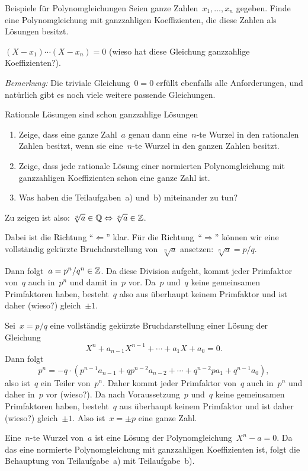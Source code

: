 \documentclass{algblatt}
\begin{document}
\ifloesungen\newpage\fi
\begin{aufgabe}{Beispiele für Polynomgleichungen}
Seien ganze Zahlen~$x_1, \ldots, x_n$ gegeben. Finde eine Polynomgleichung mit
ganzzahligen Koeffizienten, die diese Zahlen als Lösungen besitzt.
\begin{loesung}$(X-x_1) \cdots (X-x_n) = 0$ (wieso hat diese Gleichung
ganzzahlige Koeffizienten?).

\emph{Bemerkung:} Die triviale Gleichung~$0 = 0$ erfüllt ebenfalls alle
Anforderungen, und natürlich gibt es noch viele weitere passende Gleichungen.
\end{loesung}
\end{aufgabe}

\begin{aufgabe}{Rationale Lösungen sind schon ganzzahlige Lösungen}
\begin{enumerate}
  \item Zeige, dass eine ganze Zahl~$a$ genau dann eine~$n$-te Wurzel in den
  rationalen Zahlen besitzt, wenn sie eine~$n$-te Wurzel in den ganzen Zahlen
  besitzt.
  \item Zeige, dass jede rationale Lösung einer normierten Polynomgleichung mit
  ganzzahligen Koeffizienten schon eine ganze Zahl ist.
  \item Was haben die Teilaufgaben~a) und~b) miteinander zu tun?
\end{enumerate}
\begin{loesungE}
\item Zu zeigen ist also: $\sqrt[n]{a} \in \mathbb{Q} \Leftrightarrow \sqrt[n]{a} \in
\mathbb{Z}$.

Dabei ist die Richtung "`$\Leftarrow$"' klar. Für die
Richtung~"`$\Rightarrow$"' können wir eine vollständig gekürzte
Bruchdarstellung von~$\sqrt[n]{a}$ ansetzen: $\sqrt[n]{a} = p/q$.

Dann folgt~$a = p^n / q^n \in \mathbb{Z}$. Da diese Division aufgeht, kommt jeder
Primfaktor von~$q$ auch in~$p^n$ und damit in~$p$ vor. Da~$p$ und~$q$ keine
gemeinsamen Primfaktoren haben, besteht~$q$ also aus überhaupt keinem
Primfaktor und ist daher (wieso?) gleich~$\pm 1$.
\item Sei~$x = p/q$ eine vollständig gekürzte Bruchdarstellung einer Lösung der
Gleichung
\[ X^n + a_{n-1} X^{n-1} + \cdots + a_1 X + a_0 = 0. \]
Dann folgt
\[ p^n = -q \cdot (p^{n-1} a_{n-1} + q p^{n-2} a_{n-2} + \cdots + q^{n-2} p
a_1 + q^{n-1} a_0), \]
also ist~$q$ ein Teiler von~$p^n$. Daher kommt jeder Primfaktor von~$q$ auch
in~$p^n$ und daher in~$p$ vor (wieso?). Da nach Voraussetzung~$p$ und~$q$ keine
gemeinsamen Primfaktoren haben, besteht~$q$ aus überhaupt keinem Primfaktor und
ist daher (wieso?) gleich~$\pm1$. Also ist~$x = \pm p$ eine ganze Zahl.
\item Eine~$n$-te Wurzel von~$a$ ist eine Lösung der Polynomgleichung~$X^n - a
= 0$. Da das eine normierte Polynomgleichung mit ganzzahligen Koeffizienten
ist, folgt die Behauptung von Teilaufgabe~a) mit Teilaufgabe~b).
\end{loesungE}
\end{aufgabe}
\end{document}
